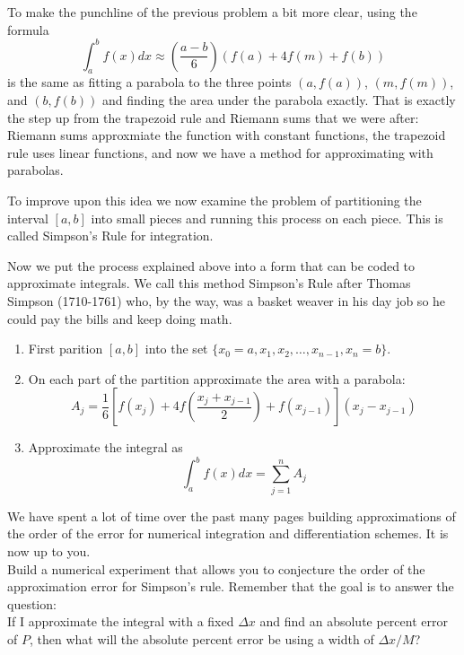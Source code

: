 To make the punchline of the previous problem a bit more clear, using the formula 
\[ \int_a^b f(x) dx \approx \left( \frac{a-b}{6} \right) \left( f(a) + 4 f(m) + f(b)
\right) \]
is the same as fitting a parabola to the three points $(a,f(a))$, $(m,f(m))$, and
$(b,f(b))$ and finding the area under the parabola exactly.  That is exactly the step up
from the trapezoid rule and Riemann sums that we were after: Riemann sums approxmiate the
function with constant functions, the trapezoid rule uses linear functions, and now we
have a method for approximating with parabolas.  

To improve upon this idea we now examine the problem of partitioning the interval $[a,b]$
into small pieces and running this process on each piece.  This is called Simpson's Rule
for integration.

\begin{technique}
    Now we put the process explained above into a form that can be coded to approximate
    integrals. We call this method Simpson's Rule after Thomas Simpson (1710-1761) who, by
    the way, was a basket weaver in his day job so he could pay the bills and keep doing
    math.
    \begin{enumerate}
        \item First parition $[a,b]$ into the set $\{x_0=a, x_1, x_2, \ldots, x_{n-1},
        x_n=b\}$.
        \item On each part of the partition approximate the area with a parabola:
            \[ A_j = \frac{1}{6} \left[ f(x_j) + 4 f\left( \frac{x_j+x_{j-1}}{2} \right) +
                f(x_{j-1}) \right]\left( x_j - x_{j-1} \right) \]
        \item Approximate the integral as
            \[ \int_a^b f(x) dx = \sum_{j=1}^n A_j \]
    \end{enumerate}
\end{technique}

\begin{problem}
    We have spent a lot of time over the past many pages building approximations of the
    order of the error for numerical integration and differentiation schemes.  It is now
    up to you.  \\
    Build a numerical experiment that allows you to conjecture the order of the
    approximation error for Simpson's rule.  Remember that the goal is to answer the
    question: \\
    If I approximate the integral with a fixed $\Delta x$ and find an absolute percent
    error of $P$, then what will the absolute percent error be using a width of $\Delta x
    / M$?
\end{problem}

